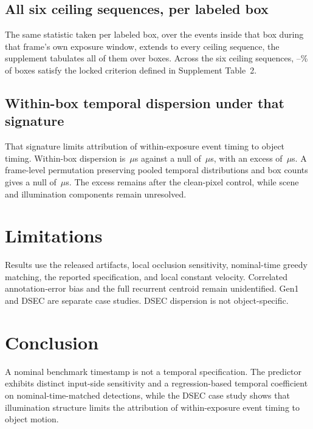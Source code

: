 \documentclass[10pt,twocolumn,letterpaper]{article}
\newcommand{\micro}{\ensuremath{\mu}}
\begin{document}
\subsection{All six ceiling sequences, per labeled box}

The same statistic taken per labeled box, over the events inside that box
during that frame's own exposure window, extends to every ceiling sequence,
the supplement tabulates all \dsecCeilingSeqs{} of them over \sixBoxes{}
boxes. Across the six ceiling sequences, \sixLockedLoPct{}--\sixLockedHiPct\% of boxes satisfy
the locked criterion defined in Supplement Table~2.


\subsection{Within-box temporal dispersion under that signature}
\label{sec:cost}

That signature limits attribution of within-exposure event timing to object timing.
Within-box dispersion is \sigmaEvtNight\,\micro s against a null of
\sigmaEvtNullNight\,\micro s, with an excess of \sigmaEvtExcessNight\,\micro s.
A frame-level permutation preserving pooled temporal distributions and box counts
gives a null of \permNull\,\micro s. The excess remains after the clean-pixel
control, while scene and illumination components remain unresolved.

\section{Limitations}

Results use the released artifacts, local occlusion sensitivity, nominal-time
greedy matching, the reported specification, and local constant velocity.
Correlated annotation-error bias and the full recurrent centroid remain
unidentified. Gen1 and DSEC are separate case studies. DSEC dispersion is not
object-specific.

\section{Conclusion}

A nominal benchmark timestamp is not a temporal specification. The predictor
exhibits distinct input-side sensitivity and a regression-based temporal
coefficient on nominal-time-matched detections, while the DSEC case study shows
that illumination structure limits the attribution of within-exposure event
timing to object motion.
\end{document}
